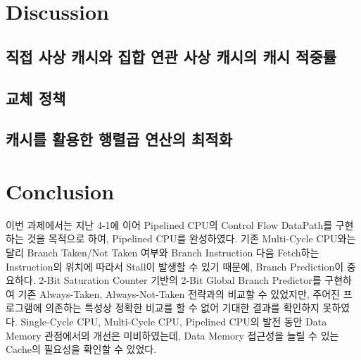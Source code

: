 \documentclass[openright, a4paper]{article}
\begin{document}

\section{Discussion}

\subsection{직접 사상 캐시와 집합 연관 사상 캐시의 캐시 적중률}

\subsection{교체 정책}

\subsection{캐시를 활용한 행렬곱 연산의 최적화}


\section{Conclusion}

이번 과제에서는 지난 4-1에 이어 Pipelined CPU의 Control Flow DataPath를 구현하는 것을 목적으로 하여, Pipelined CPU를 완성하였다.
기존 Multi-Cycle CPU와는 달리 Branch Taken/Not Taken 여부와 Branch Instruction 다음 Fetch하는 Instruction의 위치에 따라서 Stall이 발생할 수 있기 때문에, Branch Prediction이 중요하다.
2-Bit Saturation Counter 기반의 2-Bit Global Branch Predictor를 구현하여 기존 Always-Taken, Always-Not-Taken 전략과의 비교할 수 있었지만, 주어진 프로그램에 의존하는 특성상 정확한 비교를 할 수 없어 기대한 결과를 확인하지 못하였다.
Single-Cycle CPU, Multi-Cycle CPU, Pipelined CPU의 발전 동안 Data Memory 관점에서의 개선은 미비하였는데, Data Memory 접근성을 늘릴 수 있는 Cache의 필요성을 확인할 수 있었다.
\end{document}
